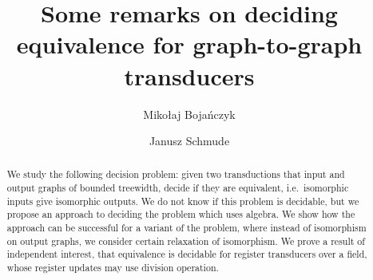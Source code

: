 \documentclass[a4paper,english]{lipics-v2019}
\title{Some remarks on deciding equivalence for graph-to-graph transducers}
\author{Miko\l aj Boja\' nczyk}{Institute of Informatics,\\ University of
Warsaw, Poland}{bojan@mimuw.edu.pl}{}{}
\author{Janusz Schmude}{Institute of Informatics,\\ University of
Warsaw, Poland}{jschmude@mimuw.edu.pl}{}{}
\begin{document}



\maketitle

\begin{abstract}
    We  study the following decision problem: given two \mso transductions that input and output graphs of bounded treewidth, decide if they are equivalent, i.e.~isomorphic inputs give isomorphic outputs. We do not know  if this problem is decidable, but  we  propose an approach to deciding the problem which uses algebra. We  show how the approach can be successful for a variant of the problem, where instead of isomorphism on output graphs, we consider certain relaxation of isomorphism. We prove a result of independent interest, that equivalence is decidable for register transducers over a field, whose register updates may use division operation.
\end{abstract}


% 


% 

%



\appendix

%
\end{document}
